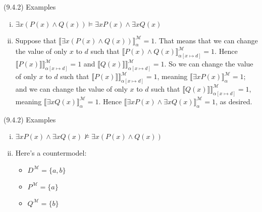 \begin{frame}{(9.4.2) Examples}

\begin{enumerate}[(i)]
\itemsep=16pt

\setcounter{enumi}{2}

\item $\exists x(P(x)\land Q(x))\vDash \exists xP(x)\land \exists xQ(x)$

		\item[] Suppose that $\llbracket\exists x(P(x)\land Q(x))\rrbracket^\mathcal{M}_\alpha=1$. That means that we can change the value of only $x$ to $d$ such that $\llbracket P(x)\land Q(x)\rrbracket^\mathcal{M}_{\alpha[x\mapsto d]}=1$. Hence $\llbracket P(x)\rrbracket\rrbracket^\mathcal{M}_{\alpha[x\mapsto d]}=1$ and $\llbracket Q(x)\rrbracket\rrbracket^\mathcal{M}_{\alpha[x\mapsto d]}=1$. So we can change the value of only $x$ to $d$ such that $\llbracket P(x)\rrbracket\rrbracket^\mathcal{M}_{\alpha[x\mapsto d]}=1$, meaning $\llbracket\exists xP(x)\rrbracket^\mathcal{M}_\alpha=1$; and we can change the value of only $x$ to $d$ such that $\llbracket Q(x)\rrbracket\rrbracket^\mathcal{M}_{\alpha[x\mapsto d]}=1$, meaning $\llbracket\exists xQ(x)\rrbracket^\mathcal{M}_\alpha=1$. Hence $\llbracket\exists xP(x)\land \exists xQ(x)\rrbracket^\mathcal{M}_\alpha=1$, as desired.
		
		\end{enumerate}

\end{frame}

\begin{frame}{(9.4.2) Examples}

\begin{enumerate}[(i)]
\itemsep=16pt

\setcounter{enumi}{7}

\item $\exists xP(x)\land \exists x Q(x)\nvDash \exists x(P(x)\land Q(x))$ 
		
		\item[] Here's a countermodel:
		
		\begin{itemize}
		
			\item $D^\mathcal{M}=\{a,b\}$
			
			\item $P^\mathcal{M}=\{a\}$
			\item $Q^\mathcal{M}=\{b\}$
		
		\end{itemize}
		
		\end{enumerate}

\end{frame}

